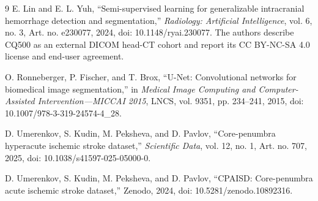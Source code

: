 \documentclass[journal]{IEEEtran}
\begin{document}
\begin{thebibliography}{9}
  E. Lin and E. L. Yuh, ``Semi-supervised learning for generalizable intracranial hemorrhage detection and segmentation,'' \emph{Radiology: Artificial Intelligence}, vol. 6, no. 3, Art. no. e230077, 2024, doi: 10.1148/ryai.230077. The authors describe CQ500 as an external DICOM head-CT cohort and report its CC BY-NC-SA 4.0 license and end-user agreement.
  
  O. Ronneberger, P. Fischer, and T. Brox, ``U-Net: Convolutional networks for biomedical image segmentation,'' in \emph{Medical Image Computing and Computer-Assisted Intervention---MICCAI 2015}, LNCS, vol. 9351, pp. 234--241, 2015, doi: 10.1007/978-3-319-24574-4\_28.
  
  D. Umerenkov, S. Kudin, M. Peksheva, and D. Pavlov, ``Core-penumbra hyperacute ischemic stroke dataset,'' \emph{Scientific Data}, vol. 12, no. 1, Art. no. 707, 2025, doi: 10.1038/s41597-025-05000-0.
  
  D. Umerenkov, S. Kudin, M. Peksheva, and D. Pavlov, ``CPAISD: Core-penumbra acute ischemic stroke dataset,'' Zenodo, 2024, doi: 10.5281/zenodo.10892316.
  \end{thebibliography}
  \balance
  
\end{document}
